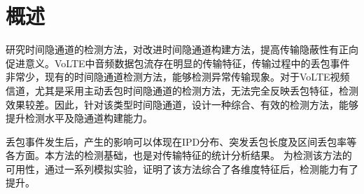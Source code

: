 \section{概述}
\label{chap:analyze:overview}

研究时间隐通道的检测方法，对改进时间隐通道构建方法，提高传输隐蔽性有正向促进意义。VoLTE中音频数据包流存在明显的传输特征，传输过程中的丢包事件非常少，现有的时间隐通道检测方法，能够检测异常传输现象。对于VoLTE视频信道，尤其是采用主动丢包时间隐通道的检测方法，无法完全反映丢包特征，检测效果较差。因此，针对该类型时间隐通道，设计一种综合、有效的检测方法，能够提升检测水平及隐通道构建能力。

丢包事件发生后，产生的影响可以体现在IPD分布、突发丢包长度及区间丢包率等各方面。本方法的检测基础，也是对传输特征的统计分析结果。
为检测该方法的可用性，通过一系列模拟实验，证明了该方法综合了各维度特征后，检测能力有了提升。